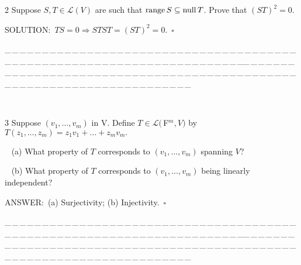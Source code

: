 \documentclass[a4paper, 11pt, UTF8]{article}
\def\range{\textup{range}\,}
\def\null{\textup{null\,}}
\def\Lm{\mathcal{L}}
\def\Fbfc{$\,{\timesbf F}$}
\begin{document}
\begin{large}
{\timesbf\Large 2} {\timessl\Large 
Suppose $S,T\in\Lm(V)$ are such that $\range S\subseteq\null T$. Prove that $(ST)^2=0$.
}\par
{\timesbf S\footnotesize{OLUTION:}}\,\,\,$TS=0\Rightarrow STST=(ST)^2=0.\,\,\,\square$\par
{\tiny \_\,\_\,\_\,\_\,\_\,\_\,\_\,\_\,\_\,\_\,\_\,\_\,\_\,\_\,\_\,\_\,\_\,\_\,\_\,\_\,\_\,\_\,\_\,\_\,\_\,\_\,\_\,\_\,\_\,\_\,\_\,\_\,\_\,\_\,\_\,\_\,\_\,\_\,\_\,\_\,\_\,\_\,\_\,\_\,\_\,\_\,\_\,\_\,\_\,\_\,\_\,\_\,\_\,\_\,\_\,\_\,\_\,\_\,\_\,\_\,\_\,\_\,\_\,\_\,\_\,\_\,\_\,\_\,\_\,\_\,\_\_\,\_\,\_\,\_\,\_\,\_\,\_\,\_\,\_\,\_\,\_\,\_\,\_\,\_\,\_\,\_\,\_\,\_\,\_\,\_\,\_\,\_\,\_\,\_\,\_\,\_\,\_\,\_\,\_\,\_\,\_\,\_\,\_\,\_\,\_\,\_\,\_\,\_\,\_\,\_\,\_\,\_\,\_\,\_\,\_\,\_\,\_\,\_\,\_\,\_\,\_\,\_\,\_\,\_\,\_\,\_\,\_\,\_\,\_\,\_\,\_\,\_\,\_\,\_\,\_\,\_\,\_\,\_\,\_\,\_\,\_}{\tiny\,\par}

{\timesbf\Large 3} {\timessl\Large 
Suppose $(v_1,\dots,v_m)$ in V. Define $T\in\Lm(\Fbfc^m, V)$ by $T(z_1,\dots,z_m)=z_1 v_1+\dots+z_m v_m.$
}\par\,\,\,
(a) {\timessl\Large What property of $T$ corresponds to $(v_1,\dots,v_m)$ spanning $V$?
}\par\,\,\,
(b) {\timessl\Large
What property of $T$ corresponds to $(v_1,\dots,v_m)$ being linearly independent?
}\par
{\timesbf A\small{NSWER:}}\,\,\,(a) Surjectivity; (b) Injectivity.$\,\,\,\square$\par
{\tiny \_\,\_\,\_\,\_\,\_\,\_\,\_\,\_\,\_\,\_\,\_\,\_\,\_\,\_\,\_\,\_\,\_\,\_\,\_\,\_\,\_\,\_\,\_\,\_\,\_\,\_\,\_\,\_\,\_\,\_\,\_\,\_\,\_\,\_\,\_\,\_\,\_\,\_\,\_\,\_\,\_\,\_\,\_\,\_\,\_\,\_\,\_\,\_\,\_\,\_\,\_\,\_\,\_\,\_\,\_\,\_\,\_\,\_\,\_\,\_\,\_\,\_\,\_\,\_\,\_\,\_\,\_\,\_\,\_\,\_\,\_\_\,\_\,\_\,\_\,\_\,\_\,\_\,\_\,\_\,\_\,\_\,\_\,\_\,\_\,\_\,\_\,\_\,\_\,\_\,\_\,\_\,\_\,\_\,\_\,\_\,\_\,\_\,\_\,\_\,\_\,\_\,\_\,\_\,\_\,\_\,\_\,\_\,\_\,\_\,\_\,\_\,\_\,\_\,\_\,\_\,\_\,\_\,\_\,\_\,\_\,\_\,\_\,\_\,\_\,\_\,\_\,\_\,\_\,\_\,\_\,\_\,\_\,\_\,\_\,\_\,\_\,\_\,\_\,\_\,\_\,\_}{\tiny\,\par}


\end{large}
\end{document}
